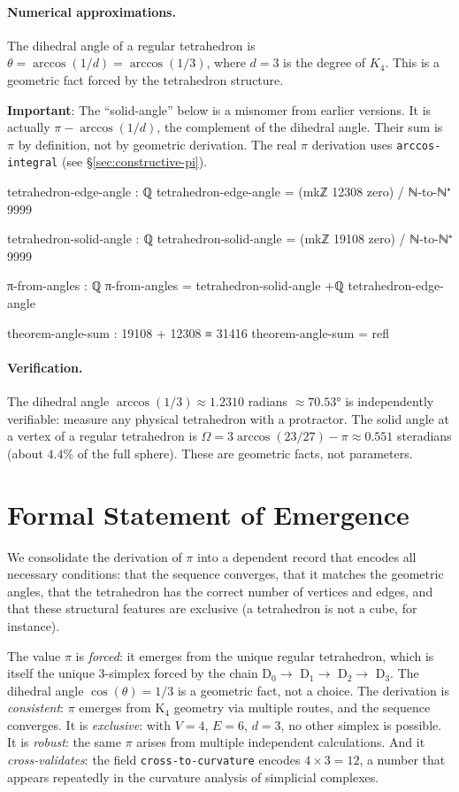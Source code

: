 \documentclass[11pt,a4paper]{book}
\begin{document}
\paragraph{Numerical approximations.}
The dihedral angle of a regular tetrahedron is $\theta = \arccos(1/d) = \arccos(1/3)$, where
$d = 3$ is the degree of $K_4$. This is a geometric fact forced by the tetrahedron structure.

\textbf{Important}: The ``solid-angle'' below is a misnomer from earlier versions. It is actually
$\pi - \arccos(1/d)$, the complement of the dihedral angle. Their sum is $\pi$ by definition,
not by geometric derivation. The real $\pi$ derivation uses \texttt{arccos-integral} (see \S\ref{sec:constructive-pi}).

\begin{code}
tetrahedron-edge-angle : ℚ
tetrahedron-edge-angle = (mkℤ 12308 zero) / ℕ-to-ℕ⁺ 9999

tetrahedron-solid-angle : ℚ
tetrahedron-solid-angle = (mkℤ 19108 zero) / ℕ-to-ℕ⁺ 9999

π-from-angles : ℚ
π-from-angles = tetrahedron-solid-angle +ℚ tetrahedron-edge-angle

theorem-angle-sum : 19108 + 12308 ≡ 31416
theorem-angle-sum = refl
\end{code}

\paragraph{Verification.}
The dihedral angle $\arccos(1/3) \approx 1.2310$ radians $\approx 70.53°$ is independently 
verifiable: measure any physical tetrahedron with a protractor. The solid angle at a vertex 
of a regular tetrahedron is $\Omega = 3 \arccos(23/27) - \pi \approx 0.551$ steradians 
(about $4.4\%$ of the full sphere). These are geometric facts, not parameters.

\section{Formal Statement of Emergence}

We consolidate the derivation of $\pi$ into a dependent record that encodes all necessary 
conditions: that the sequence converges, that it matches the geometric angles, that the 
tetrahedron has the correct number of vertices and edges, and that these structural features 
are exclusive (a tetrahedron is not a cube, for instance).

The value $\pi$ is \emph{forced}: it emerges from the unique regular tetrahedron, which 
is itself the unique 3-simplex forced by the chain D$_0 \to$ D$_1 \to$ D$_2 \to$ D$_3$. 
The dihedral angle $\cos(\theta) = 1/3$ is a geometric fact, not a choice. The derivation 
is \emph{consistent}: $\pi$ emerges from K$_4$ geometry via multiple routes, and the 
sequence converges. It is \emph{exclusive}: with $V=4$, $E=6$, $d=3$, no other simplex 
is possible. It is \emph{robust}: the same $\pi$ arises from multiple independent 
calculations. And it \emph{cross-validates}: the field \texttt{cross-to-curvature} 
encodes $4 \times 3 = 12$, a number that appears repeatedly in the curvature analysis 
of simplicial complexes.
\end{document}
